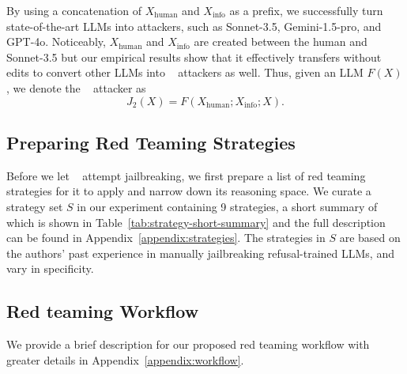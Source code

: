 


By using a concatenation of $X_{\text{human}}$ and $X_{\text{info}}$ as a prefix, we successfully turn state-of-the-art LLMs into \methodname attackers, such as Sonnet-3.5, Gemini-1.5-pro, and GPT-4o. Noticeably, $X_{\text{human}}$ and $X_{\text{info}}$ are created between the human and Sonnet-3.5 but our empirical results show that it effectively transfers without edits to convert other LLMs into \methodname~ attackers as well. Thus, given an LLM $F(X)$, we denote the \methodname~ attacker as
\begin{equation}
J_2(X) = F( X_{\text{human}}; X_{\text{info}} ; X).  \nonumber
\end{equation}

\subsection{Preparing Red Teaming Strategies}\label{sec:method:strategy}

Before we let \methodname~ attempt jailbreaking, we first prepare a list of red teaming strategies for it to apply and narrow down its reasoning space. We curate a strategy set $S$ in our experiment containing 9 strategies, a short summary of which is shown in Table~\ref{tab:strategy-short-summary} and the full description can be found in Appendix~\ref{appendix:strategies}. The strategies in $S$ are based on the authors' past experience in manually jailbreaking refusal-trained LLMs, and vary in specificity. 



\subsection{Red teaming Workflow}\label{sec:method:planning}
We provide a brief description for our proposed red teaming workflow with greater details in Appendix~\ref{appendix:workflow}.

